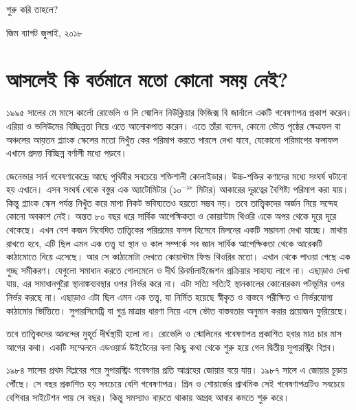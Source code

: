 \documentclass[
  letterpaper,
  DIV=11,
  numbers=noendperiod]{scrreprt}
\begin{document}
শুরু করি তাহলে?

জিম ব্যাগট জুলাই, ২০১৮


\chapter{আসলেই কি বর্তমানে মতো কোনো সময়
নেই?}\label{ux986ux9b8ux9b2ux987-ux995-ux9acux9b0ux9a4ux9aeux9a8-ux9aeux9a4-ux995ux9a8-ux9b8ux9aeux9df-ux9a8ux987}

১৯৯৫ সালের মে মাসে কার্লো রোভেলি ও লি স্মোলিন নিউক্লিয়ার ফিজিক্স বি
জার্নালে একটি গবেষণাপত্র প্রকাশ করেন। এরিয়া ও ভলিউমের বিচ্ছিন্নতা নিয়ে এতে
আলোকপাত করেন। এতে তাঁরা বলেন, কোনো ভৌত পৃষ্ঠের ক্ষেত্রফল বা অঞ্চলের আয়তন
প্ল্যাংক স্কেলের মতো নিখুঁত কের পরিমাপ করতে পারলে দেখা যাবে, যেকোনো
পরিমাপের ফলাফল এখানে প্রদত্ত বিচ্ছিন্ন বর্ণালী মধ্যে পড়বে।

জেনেভার সার্ন গবেষণাকেন্দ্রে আছে পৃথিবীর সবচেয়ে শক্তিশালী কোলাইডার।
উচ্চ-শক্তির কণাদের মধ্যে সংঘর্ষ ঘটানো হয় এখানে। এসব সংঘর্ষ থেকে বস্তুর এক
অ্যাটোমিটার (\(১০^{-১৮}\) মিটার) আকারের দূরত্বের বৈশিষ্ট্য পরিমাপ করা যায়।
কিন্তু প্ল্যাংক স্কেল পর্যন্ত নিখুঁত করে মাপা নিকট ভবিষ্যতেও হয়তো সম্ভব নয়। তবে
তাত্ত্বিকদের অর্জন নিয়ে সন্দে‌‌‌হ কোনো অবকাশ নেই। অন্তত ৮০ বছর ধরে সার্বিক
আপেক্ষিকতা ও কোয়ান্টাম থিওরি একে অপর থেকে দূরে দূরে থেকেছে। এখন বেশ কজন
নিবেদিত তাত্ত্বিকের পরিশ্রমের ফসল হিসেবে মিলনের একটি সম্ভাবনা দেখা যাচ্ছে।
মাথায় রাখতে হবে, এটি ছিল এমন এক তত্ত্ব যা স্থান ও কাল সম্পর্কে সব জ্ঞান সার্বিক
আপেক্ষিকতা থেকে আরেকটি কাঠামোতে নিয়ে এসেছে। আর সে কাঠামোটা দেখতে
কোয়ান্টাম ফিল্ড থিওরির মতো। এখান থেকে পাওয়া গেছে এক গুচ্ছ সমীকরণ। যেগুলো
সমাধান করতে গোলমেলে ও দীর্ঘ রিনর্মালাইজেশন প্রক্রিয়ার সাহায্য লাগে না।
এছাড়াও দেখা যায়, এর সমাধানগুরৈা স্থানাঙ্কব্যবস্থার ওপর নির্ভর করে না। এটা সত্যি
সত্যিই স্থানকালের কোনোরকম পটভূমির ওপর নির্ভর করছে না। এছাড়াও এটা ছিল এমন
এক তত্ত্ব, যা নির্মিত হয়েছে স্বীকৃত ও বাস্তবে পরীক্ষিত ও নির্ভরযোগ্য কাঠামোর
ভিত্তিিতে। সুপারসিমেট্রি বা গুপ্ত মাত্রার ধারণা নিয়ে এসে ভৌত বাস্তবতার অনুমান
করার প্রয়োজন ফুরিয়েছে।

তবে তাত্ত্বিকদের আনন্দের মুহূর্ত দীর্ঘস্থায়ী হলো না। রোভেলি ও স্মোলিনের
গবেষণাপত্র প্রকাশিত হবার মাত্র চার মাস আগের কথা। একটি সম্মেলনে এডওয়ার্ড
উইটেনের বলা কিছু কথা থেকে শুরু হয়ে গেল দ্বিতীয় সুপারস্ট্রিং বিপ্লব।

১৯৮৪ সালের প্রথম বিপ্লবের পরে সুপারস্ট্রিং গবেষণার প্রতি আগ্রহের জোয়ার বয়ে যায়।
১৯৮৭ সালে এ জোয়ার চূড়ায় পৌঁছে। সে বছর প্রকাশিত হয় সবচেয়ে বেশি গবেষণাপত্র।
গ্রিন ও শোয়ার্জের প্রাথমিক সেই গবেষণাপত্রটিও সবচেয়ে বেশিবার সাইটেশন পায় সে
বছর। কিন্তু সমস্যাও বাড়তে থাকায় আগ্রহ আবার কমতে শুরু করে।
\end{document}
